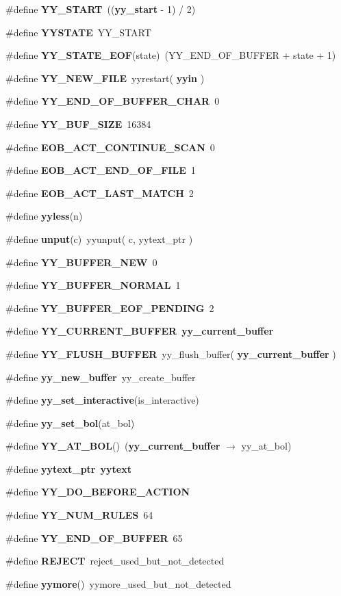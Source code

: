 \begin{CompactItemize}
\item 
\#define {\bf YY\_\-START}\ (({\bf yy\_\-start} - 1) / 2)
\item 
\#define {\bf YYSTATE}\ YY\_\-START
\item 
\#define {\bf YY\_\-STATE\_\-EOF}(state)\ (YY\_\-END\_\-OF\_\-BUFFER + state + 1)
\item 
\#define {\bf YY\_\-NEW\_\-FILE}\ yyrestart( {\bf yyin} )
\item 
\#define {\bf YY\_\-END\_\-OF\_\-BUFFER\_\-CHAR}\ 0
\item 
\#define {\bf YY\_\-BUF\_\-SIZE}\ 16384
\item 
\#define {\bf EOB\_\-ACT\_\-CONTINUE\_\-SCAN}\ 0
\item 
\#define {\bf EOB\_\-ACT\_\-END\_\-OF\_\-FILE}\ 1
\item 
\#define {\bf EOB\_\-ACT\_\-LAST\_\-MATCH}\ 2
\item 
\#define {\bf yyless}(n)
\item 
\#define {\bf unput}(c)\ yyunput( c, yytext\_\-ptr )
\item 
\#define {\bf YY\_\-BUFFER\_\-NEW}\ 0
\item 
\#define {\bf YY\_\-BUFFER\_\-NORMAL}\ 1
\item 
\#define {\bf YY\_\-BUFFER\_\-EOF\_\-PENDING}\ 2
\item 
\#define {\bf YY\_\-CURRENT\_\-BUFFER}\ {\bf yy\_\-current\_\-buffer}
\item 
\#define {\bf YY\_\-FLUSH\_\-BUFFER}\ yy\_\-flush\_\-buffer( {\bf yy\_\-current\_\-buffer} )
\item 
\#define {\bf yy\_\-new\_\-buffer}\ yy\_\-create\_\-buffer
\item 
\#define {\bf yy\_\-set\_\-interactive}(is\_\-interactive)
\item 
\#define {\bf yy\_\-set\_\-bol}(at\_\-bol)
\item 
\#define {\bf YY\_\-AT\_\-BOL}()\ ({\bf yy\_\-current\_\-buffer} $\rightarrow$ yy\_\-at\_\-bol)
\item 
\#define {\bf yytext\_\-ptr}\ {\bf yytext}
\item 
\#define {\bf YY\_\-DO\_\-BEFORE\_\-ACTION}
\item 
\#define {\bf YY\_\-NUM\_\-RULES}\ 64
\item 
\#define {\bf YY\_\-END\_\-OF\_\-BUFFER}\ 65
\item 
\#define {\bf REJECT}\ reject\_\-used\_\-but\_\-not\_\-detected
\item 
\#define {\bf yymore}()\ yymore\_\-used\_\-but\_\-not\_\-detected

\end{CompactItemize}
